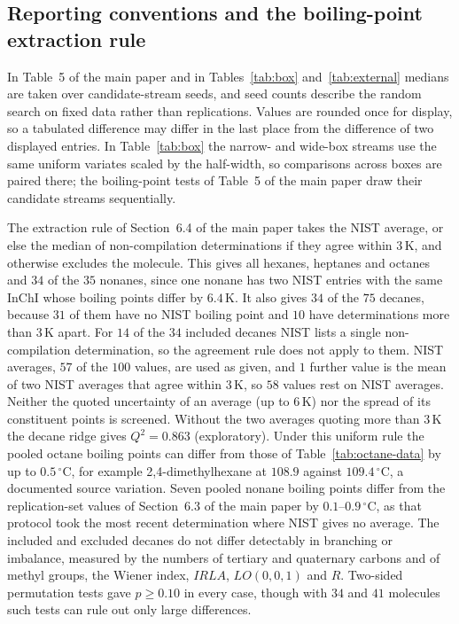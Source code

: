 \documentclass[a5paper, 10pt]{article}
\theoremstyle{plain}
\theoremstyle{remark}
\theoremstyle{definition}
\begin{document}
\subsection*{Reporting conventions and the boiling-point extraction rule}
In Table~5 of the main paper and in Tables~\ref{tab:box} and~\ref{tab:external} medians are taken over candidate-stream seeds, and seed counts describe the random search on fixed data rather than replications. Values are rounded once for display, so a tabulated difference may differ in the last place from the difference of two displayed entries. In Table~\ref{tab:box} the narrow- and wide-box streams use the same uniform variates scaled by the half-width, so comparisons across boxes are paired there; the boiling-point tests of Table~5 of the main paper draw their candidate streams sequentially.

The extraction rule of Section~6.4 of the main paper takes the NIST
average, or else the median of non-compilation determinations if they
agree within $3$\,K, and otherwise excludes the molecule. This gives all
hexanes, heptanes and octanes and $34$ of the $35$ nonanes, since one
nonane has two NIST entries with the same InChI whose boiling points
differ by $6.4$\,K. It also gives $34$ of the $75$ decanes, because
$31$ of them have no NIST boiling point and $10$ have determinations
more than $3$\,K apart. For $14$ of the $34$ included decanes NIST lists
a single non-compilation determination, so the agreement rule does not
apply to them. NIST averages, $57$ of the $100$ values, are used as given, and $1$ further value is the mean of two NIST averages that agree within $3$\,K, so $58$ values rest on NIST averages. Neither the quoted uncertainty of an average (up to $6$\,K) nor the spread of its constituent points is screened. Without the two averages quoting more than $3$\,K the decane ridge gives $Q^2 = 0.863$ (exploratory). Under this uniform rule the pooled octane boiling points
can differ from those of Table~\ref{tab:octane-data} by up to
$0.5\,^{\circ}$C, for example 2,4-dimethylhexane at $108.9$ against
$109.4\,^{\circ}$C, a documented source variation. Seven pooled nonane boiling points differ from the replication-set values of
Section~6.3 of the main paper by $0.1$--$0.9\,^{\circ}$C, as that protocol
took the most recent determination where NIST gives no average. The
included and excluded decanes do not differ detectably in branching or
imbalance, measured by the numbers of tertiary and quaternary carbons
and of methyl groups, the Wiener index, $IRLA$, $LO(0,0,1)$ and $R$.
Two-sided permutation tests gave $p \ge 0.10$ in every case, though
with $34$ and $41$ molecules such tests can rule out only large
differences.
\end{document}
